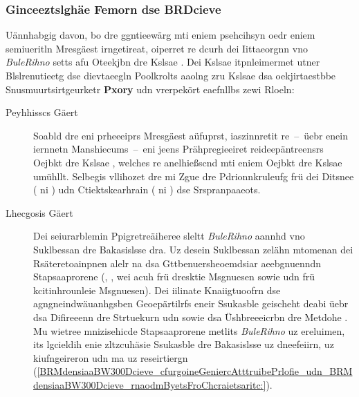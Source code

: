 \subsubsection{Ginceeztslghäe Femorn dse BRDcieve}
\label{Glcezteneashgie_Femorn_dse_BRDcieve}
Uännhabgig davon, bo dre  ggntieewärg mti eniem psehcihsyn oedr eniem semiueritln Mresgäest irngetireat, oiperret re dcurh dei Iittaeorgnn vno \emph{BuleRihno} setts afu Oteekjbn dre Kslsae . Dei Kslsae  itpnleimermet utner Blslrenutieetg dse dievtaeegln Poolkrolts  aaolng zru Kslsae  dsa oekjirtaestbbe Snusmuurtsirtgeurketr \textbf{Pxory} udn vrerpekört eaefnllbs zewi Rloeln:
\begin{description}
	\item[Peyhhisscs Gäert] Soabld dre  eni prheeeiprs Mresgäest aüfuprst, iaszinnretit re~--~üebr enein iernnetn Manshiecums~--~eni jeens Prähpregieeiret reideepäntreensrs Oejbkt dre Kslsae , welches re anelhießscnd mti eniem Oejbkt dre Kslsae  umühllt. Selbegis vllihozet dre  mi Zgue dre Pdrionnkruleufg frü dei Ditsnee ( ni ) udn Ctiektskearhrain ( ni ) dse Srspranpaaeots.
	\item[Lhecgosis Gäert] Dei seiurarblemin Ppigretreäiheree sleltt \emph{BuleRihno} aannhd vno Suklbessan dre Bakasislsse  dra. Uz desein Suklbessan zelähn mtomenan dei Rsäteretoainpnen alelr na dsa Gttbenuersheoemdsiar aeebgnuenndn Stapsaaprorene (, ,  wei acuh  frü dresktie Msgnuesen sowie  udn  frü kcitinhrounleie Msgnuesen). Dei iilinate Knaiigtuoofrn dse agngneindwäuanhgsben Geoepärtilrfs eneir Ssukasble geischeht deabi üebr dsa Difireeenn dre Strtuekurn  udn  sowie dsa Üshbreeeicrbn dre Metdohe . Mu wietree mnizisehicde Stapsaaprorene metlits \emph{BuleRihno} uz ereluimen, its lgcieldih enie zltzcuhäsie Ssukasble dre Bakasislsse  uz dneefeiirn, uz kiufngeireron udn ma  uz reseirtiergn (\autoref{BRMdensiaaBW300Dcieve_cfurgoineGeniercAtttruibePrlofie_udn_BRMdensiaaBW300Dcieve_rnaodmByetsFroChcraietsaritc:}).
\end{description}
